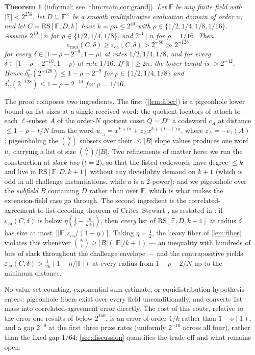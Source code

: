 \documentclass[11pt]{article}
\newtheorem{theorem}{Theorem}[section]
\theoremstyle{definition}
\theoremstyle{remark}
\newcommand{\F}{\mathbb{F}}
\newcommand{\B}{B}
\newcommand{\RS}{\mathrm{RS}}
\newcommand{\eca}{\varepsilon_{\mathrm{ca}}}
\newcommand{\emca}{\varepsilon_{\mathrm{mca}}}
\newcommand{\eone}{e_1}
\begin{document}
\begin{theorem}[informal; see \cref{thm:main,cor:grand}]\label{thm:informal}
Let $\F$ be any finite field with $|\F|<2^{256}$, let $D\subseteq\F^\times$ be a smooth multiplicative evaluation domain of order $n$, and let $C=\RS[\F,D,k]$ have $k=\rho n\le2^{40}$ with $\rho\in\{1/2,1/4,1/8,1/16\}$. Assume $2^{10}\mid n$ for $\rho\in\{1/2,1/4,1/8\}$, and $2^{11}\mid n$ for $\rho=1/16$. Then
\[
\emca(C,\delta)\ge\eca(C,\delta)>2^{-86}\gg2^{-128}
\]
for every $\delta\in[1-\rho-2^{-9},1-\rho)$ at rates $1/2,1/4,1/8$, and for every $\delta\in[1-\rho-2^{-10},1-\rho)$ at rate $1/16$. If $|\F|\ge2n$, the lower bound is $>2^{-42}$. Hence $\delta^*_C(2^{-128})\le1-\rho-2^{-9}$ for $\rho\in\{1/2,1/4,1/8\}$ and $\delta^*_C(2^{-128})\le1-\rho-2^{-10}$ for $\rho=1/16$.
\end{theorem}

The proof composes two ingredients. The first (\cref{lem:fiber}) is a pigeonhole lower bound on list sizes at a single received word: the quotient locators of \cite{Cho26a} attach to each $\ell$-subset $A$ of the order-$N$ quotient coset $Q=D^{a}$ a codeword $c_A$ at distance $\le1-\rho-t/N$ from the word $u_{z_A}=x^{k+ta}+z_Ax^{k+(t-1)a}$, where $z_A=-\eone(A)$; pigeonholing the $\binom N\ell$ subsets over their $\le|\B|$ slope values produces one word $u_z$ carrying a list of size $\binom N\ell/|\B|$. Two refinements of \cite[Main Thm.\,(d)]{Cho26a} matter here: we run the construction at \emph{slack two} ($t=2$), so that the listed codewords have degree $\le k$ and live in $\RS[\F,D,k+1]$ without any divisibility demand on $k+1$ (which is odd in all challenge instantiations, while $a$ is a $2$-power); and we pigeonhole over the \emph{subfield} $\B$ containing $D$ rather than over $\F$, which is what makes the extension-field case go through. The second ingredient is the correlated-agreement-to-list-decoding theorem of Crites--Stewart \cite{CS25}, as restated in \cite[Thm.~5.3]{ABF26}: if $\eca(C,\delta)$ is below $\eta(\frac1k-\frac n{k|\F|})$, then \emph{every} list of $\RS[\F,D,k+1]$ at radius $\delta$ has size at most $\lceil|\F|\,\eca/(1-\eta)\rceil$. Taking $\eta=\frac12$, the heavy fiber of \cref{lem:fiber} violates this whenever $\binom N\ell\ge|\B|(|\F|/k+1)$ --- an inequality with hundreds of bits of slack throughout the challenge envelope --- and the contrapositive yields $\eca(C,\delta)>\frac1{2k}(1-n/|\F|)$ at every radius from $1-\rho-2/N$ up to the minimum distance.

No value-set counting, exponential-sum estimate, or equidistribution hypothesis enters: pigeonhole fibers exist over every field unconditionally, and \cite{CS25} converts list mass into correlated-agreement error directly. The cost of this route, relative to the error-one results of \cite{Cho26a,Cho26b} below $2^{150}$, is an error of order $1/k$ rather than $1-o(1)$, and a gap $2^{-9}$ at the first three prize rates (uniformly $2^{-10}$ across all four), rather than the fixed gap $1/64$; \cref{sec:discussion} quantifies the trade-off and what remains open.
\end{document}
